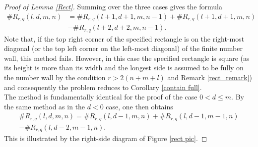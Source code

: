 \documentclass{article}
\theoremstyle{definition}
\numberwithin{equation}{subsection}
\begin{document}
\begin{proof}[Proof of Lemma \ref{Rect}]
Summing over the three cases gives the formula \begin{align}\#R_{r,q}(l,d,m,n)&=\#R_{r,q}({l+1,d+1,m,n-1})+\#R_{r,q}({l+1,d+1,m,n})\nonumber\\&-\#R_{r,q}({l+2,d+2,m,n-1}).\label{vert_rec_eqn}\end{align}
\noindent Note that, if the top right corner of the specified rectangle is on the right-most diagonal (or the top left corner on the left-most diagonal) of the finite number wall, this method fails. However, in this case the specified rectangle is square (as its height is more than its width and the longest side is assumed to be fully on the number wall by the condition $r>2(n+m+l)$ and Remark \ref{rect_remark}) and consequently the problem reduces to Corollary \ref{contain full}.\\

\noindent The method is fundamentally identical for the proof of the case $0<d\le m$. By the same method as in the $d<0$ case, one then obtains  \begin{align}\#R_{r,q}(l,d,m,n)=\#R_{r,q}({l,d-1,m,n})+\#R_{r,q}({l,d-1,m-1,n})\nonumber\\-\#R_{r,q}({l,d-2,m-1,n}).\label{Rect6}\end{align} This is illustrated by the right-side diagram of Figure \ref{rect pic}.

\end{proof}
\end{document}
